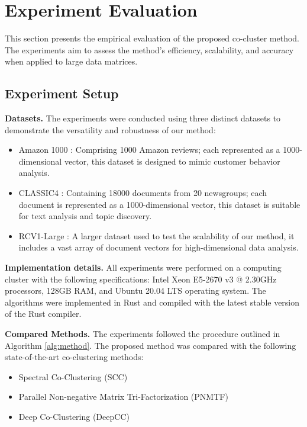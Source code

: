 \section{Experiment Evaluation}
\label{sec:experiment}
This section presents the empirical evaluation of the proposed co-cluster method. The experiments aim to assess the method's efficiency, scalability, and accuracy when applied to large data matrices.
\subsection{Experiment Setup}

\textbf{Datasets.}
The experiments were conducted using three distinct datasets to demonstrate the versatility and robustness of our method:

\begin{itemize}
    \item Amazon 1000 \cite{ni2019justifying}: Comprising 1000 Amazon reviews; each represented as a 1000-dimensional vector, this dataset is designed to mimic customer behavior analysis.
    \item CLASSIC4 \cite{reddy2021weclustering}: Containing 18000 documents from 20 newsgroups; each document is represented as a 1000-dimensional vector, this dataset is suitable for text analysis and topic discovery.
    \item RCV1-Large \cite{lewis2004rcv1}: A larger dataset used to test the scalability of our method, it includes a vast array of document vectors for high-dimensional data analysis.
\end{itemize}

\textbf{Implementation details.}
All experiments were performed on a computing cluster with the following specifications: Intel Xeon E5-2670 v3 @ 2.30GHz processors, 128GB RAM, and Ubuntu 20.04 LTS operating system. The algorithms were implemented in Rust and compiled with the latest stable version of the Rust compiler.

\textbf{Compared Methods.}
The experiments followed the procedure outlined in Algorithm \ref{alg:method}. The proposed method was compared with the following state-of-the-art co-clustering methods:

\begin{itemize}
    \item Spectral Co-Clustering (SCC) \cite{dhillon2001CoclusteringDocumentsWords}
    \item Parallel Non-negative Matrix Tri-Factorization (PNMTF)\cite{chen2023ParallelNonNegativeMatrix}
    \item Deep Co-Clustering (DeepCC) \cite{dongkuanxu2019DeepCoClustering}
\end{itemize}

